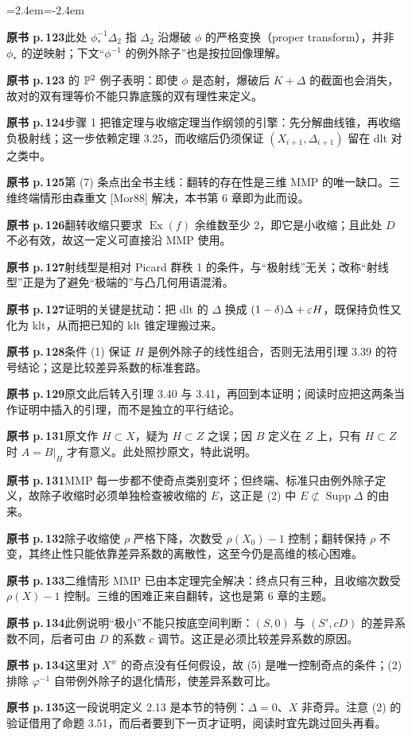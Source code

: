 \begin{list}{}{\leftmargin=2.4em\itemindent=-2.4em\itemsep=2pt\parsep=0pt}
\item \textbf{原书 p.\,123}\quad 此处 $\phi_*^{-1}\Delta_2$ 指 $\Delta_2$ 沿爆破 $\phi$ 的严格变换（proper transform），并非 $\phi_*$ 的逆映射；下文“$\phi^{-1}$ 的例外除子”也是按拉回像理解。
\item \textbf{原书 p.\,123} 的 $\mathbb{P}^2$ 例子表明：即使 $\phi$ 是态射，爆破后 $K+\Delta$ 的截面也会消失，故对的双有理等价不能只靠底簇的双有理性来定义。
\item \textbf{原书 p.\,124}\quad 步骤 1 把锥定理与收缩定理当作纲领的引擎：先分解曲线锥，再收缩负极射线；这一步依赖定理 3.25，而收缩后仍须保证 $(X_{i+1},\Delta_{i+1})$ 留在 dlt 对之类中。
\item \textbf{原书 p.\,125}\quad 第 (7) 条点出全书主线：翻转的存在性是三维 MMP 的唯一缺口。三维终端情形由森重文 [Mor88] 解决，本书第 6 章即为此而设。
\item \textbf{原书 p.\,126}\quad 翻转收缩只要求 $\operatorname{Ex}(f)$ 余维数至少 2，即它是小收缩；且此处 $D$ 不必有效，故这一定义可直接沿 MMP 使用。
\item \textbf{原书 p.\,127}\quad 射线型是相对 Picard 群秩 1 的条件，与“极射线”无关；改称“射线型”正是为了避免“极端的”与凸几何用语混淆。
\item \textbf{原书 p.\,127}\quad 证明的关键是扰动：把 dlt 的 $\Delta$ 换成 $(1-\delta)\Delta+\varepsilon H$，既保持负性又化为 klt，从而把已知的 klt 锥定理搬过来。
\item \textbf{原书 p.\,128}\quad 条件 (1) 保证 $H$ 是例外除子的线性组合，否则无法用引理 3.39 的符号结论；这是比较差异系数的标准套路。
\item \textbf{原书 p.\,129}\quad 原文此后转入引理 3.40 与 3.41，再回到本证明；阅读时应把这两条当作证明中插入的引理，而不是独立的平行结论。
\item \textbf{原书 p.\,131}\quad 原文作 $H\subset X$，疑为 $H\subset Z$ 之误；因 $B$ 定义在 $Z$ 上，只有 $H\subset Z$ 时 $A=B|_H$ 才有意义。此处照抄原文，特此说明。
\item \textbf{原书 p.\,131}\quad MMP 每一步都不使奇点类别变坏；但终端、标准只由例外除子定义，故除子收缩时必须单独检查被收缩的 $E$，这正是 (2) 中 $E\not\subset\operatorname{Supp}\Delta$ 的由来。
\item \textbf{原书 p.\,132}\quad 除子收缩使 $\rho$ 严格下降，次数受 $\rho(X_0)-1$ 控制；翻转保持 $\rho$ 不变，其终止性只能依靠差异系数的离散性，这至今仍是高维的核心困难。
\item \textbf{原书 p.\,133}\quad 二维情形 MMP 已由本定理完全解决：终点只有三种，且收缩次数受 $\rho(X)-1$ 控制。三维的困难正来自翻转，这也是第 6 章的主题。
\item \textbf{原书 p.\,134}\quad 此例说明“极小”不能只按底空间判断：$(S,0)$ 与 $(S',cD)$ 的差异系数不同，后者可由 $D$ 的系数 $c$ 调节。这正是必须比较差异系数的原因。
\item \textbf{原书 p.\,134}\quad 这里对 $X^{w}$ 的奇点没有任何假设，故 (5) 是唯一控制奇点的条件；(2) 排除 $\varphi^{-1}$ 自带例外除子的退化情形，使差异系数可比。
\item \textbf{原书 p.\,135}\quad 这一段说明定义 2.13 是本节的特例：$\Delta=0$、$X$ 非奇异。注意 (2) 的验证借用了命题 3.51，而后者要到下一页才证明，阅读时宜先跳过回头再看。
\end{list}

